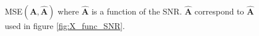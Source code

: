 \begin{figure}[H]
\begin{widepage}
\begin{minipage}[t]{.45\textwidth}
		\caption{MSE$(\mathbf{A}, \hat{\mathbf{A}})$ where $\hat{\mathbf{A}}$ is a function of the SNR. $\hat{\mathbf{A}}$ correspond to $\hat{\mathbf{A}}$ used in figure \ref{fig:X_func_SNR}.}
		\label{fig:A_func_SNR}
    \end{minipage}
\end{widepage}
\end{figure}
\noindent